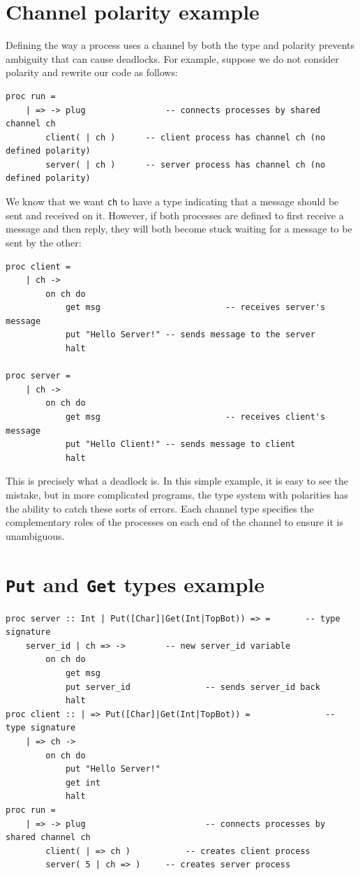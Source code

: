 \documentclass[11pt]{article}
\begin{document}
\section{Channel polarity example}
\label{Sec: channel polarity deadlock prevention}
Defining the way a process uses a channel by both the type and polarity prevents ambiguity that can cause deadlocks.
For example, suppose we do not consider polarity and rewrite our code as follows:

\newpage
\begin{lstlisting}[label=ex:ambiguityce, caption=Code without channel polarity (this code will not compile)]
 proc run =
	| => -> plug				-- connects processes by shared channel ch
		client( | ch )		-- client process has channel ch (no defined polarity)
		server( | ch )		-- server process has channel ch (no defined polarity)
\end{lstlisting}

We know that we want \lstinline$ch$ to have a type indicating that a message should be sent and received on it.
However, if both processes are defined to first receive a message and then reply, they will both become stuck waiting for a message to be sent by the other:
\begin{lstlisting}
proc client =
	| ch ->
		on ch do
			get msg							-- receives server's message
			put "Hello Server!"	-- sends message to the server
			halt

proc server =
	| ch ->
		on ch do
			get msg							-- receives client's message
			put "Hello Client!"	-- sends message to client
			halt
\end{lstlisting}
This is precisely what a deadlock is.
In this simple example, it is easy to see the mistake, but in more complicated programs, the type system with polarities has the ability to catch these sorts of errors.
Each channel type specifies the complementary roles of the processes on each end of the channel to ensure it is unambiguous.

\section{\lstinline$Put$ and \lstinline$Get$ types example}
\label{Sec:ex-put-get}

\begin{lstlisting}
proc server :: Int | Put([Char]|Get(Int|TopBot)) => =		-- type signature 
	server_id | ch => ->		-- new server_id variable
		on ch do
			get msg
			put server_id				-- sends server_id back
			halt
proc client :: | => Put([Char]|Get(Int|TopBot)) =				-- type signature
	| => ch ->
		on ch do 
			put "Hello Server!"	
			get int					
			halt
proc run =
	| => -> plug						-- connects processes by shared channel ch
		client( | => ch )			-- creates client process
		server( 5 | ch => )		-- creates server process
\end{lstlisting}
\end{document}
